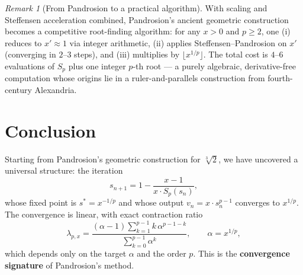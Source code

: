 \documentclass[10pt,a4paper,oneside]{book}
\theoremstyle{definition}
\theoremstyle{remark}
\newtheorem{remark}[theorem]{Remark}
\newcommand{\cbrt}[1]{\sqrt[3]{#1}}
\begin{document}
\begin{remark}[From Pandrosion to a practical algorithm]
With scaling and Steffensen acceleration combined, Pandrosion's ancient geometric construction becomes a competitive root-finding algorithm: for any $x > 0$ and $p \geq 2$, one (i) reduces to $x' \approx 1$ via integer arithmetic, (ii) applies Steffensen--Pandrosion on $x'$ (converging in $2$--$3$ steps), and (iii) multiplies by $\lfloor x^{1/p} \rfloor$. The total cost is $4$--$6$ evaluations of $S_p$ plus one integer $p$-th root --- a purely algebraic, derivative-free computation whose origins lie in a ruler-and-parallels construction from fourth-century Alexandria.
\end{remark}

\section{Conclusion}
\label{sec:conclusion}

Starting from Pandrosion's geometric construction for $\cbrt{2}$, we have uncovered a universal structure: the iteration
\[
  s_{n+1} = 1 - \frac{x-1}{x \cdot S_p(s_n)},
\]
whose fixed point is $s^* = x^{-1/p}$ and whose output $v_n = x \cdot s_n^{p-1}$ converges to $x^{1/p}$. The convergence is linear, with exact contraction ratio
\[
  \lambda_{p,x} = \frac{(\alpha-1)\displaystyle\sum_{k=1}^{p-1} k\,\alpha^{p-1-k}}{\displaystyle\sum_{k=0}^{p-1}\alpha^k}, \qquad \alpha = x^{1/p},
\]
which depends only on the target $\alpha$ and the order $p$. This is the \textbf{convergence signature} of Pandrosion's method.

\medskip
\end{document}
